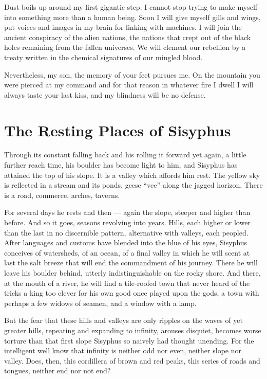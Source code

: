 \documentclass[english,11pt,letterpaper,onecolumn,parskip=full]{scrbook}
\begin{document}
	Dust boils up around my first gigantic step.  I cannot stop trying to make myself into something more than a human being.  Soon I will give myself gills and wings, put voices and images in my brain for linking with machines.  I will join the ancient conspiracy of the alien nations, the nations that crept out of the black holes remaining from the fallen universes.  We will clement our rebellion by a treaty written in the chemical signatures of our mingled blood.

	Nevertheless, my son, the memory of your feet pursues me.  On the mountain you were pierced at my command and for that reason in whatever fire I dwell I will always taste your last kiss, and my blindness will be no defense.

\newpage
\section{The Resting Places of Sisyphus}
	Through its constant falling back and his rolling it forward yet again, a little further reach time, his boulder has become light to him, and Sisyphus has attained the top of his slope.  It is a valley which affords him rest.  The yellow sky is reflected in a stream and its ponds, geese ``vee'' along the jagged horizon.  There is a road, commerce, arches, taverns.

	For several days he rests and then --- again the slope, steeper and higher than before.  And so it goes, seasons revolving into years.  Hills, each higher or lower than the last in no discernible pattern, alternative with valleys, each peopled.  After languages and customs have blended into the blue of his eyes, Sisyphus conceives of watersheds, of an ocean, of a final valley in which he will scent at last the salt breeze that will end the commandment of his journey.  There he will leave his boulder behind, utterly indistinguishable on the rocky shore.  And there, at the mouth of a river, he will find a tile-roofed town that never heard of the tricks a king too clever for his own good once played upon the gods, a town with perhaps a few widows of seamen, and a window with a lamp.

	But the fear that these hills and valleys are only ripples on the waves of yet greater hills, repeating and expanding to infinity, arouses disquiet, becomes worse torture than that first slope Sisyphus so naively had thought unending.  For the intelligent well know that infinity is neither odd nor even, neither slope nor valley.  Does, then, this cordillera of brown and red peaks, this series of roads and tongues, neither end nor not end?
\end{document}
